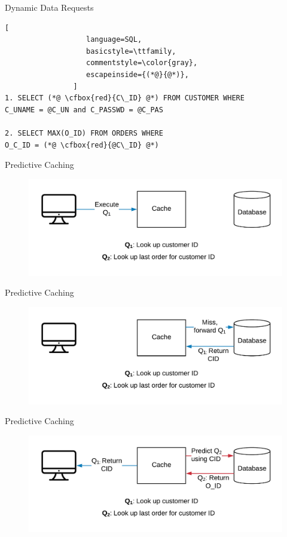 \documentclass[10pt]{beamer}
\newcommand{\cfbox}[2]{%
    \colorlet{currentcolor}{.}%
    {\color{#1}%
    \fbox{\color{currentcolor}#2}}%
}
\begin{document}
\begin{frame}[fragile]{Dynamic Data Requests}
        \begin{lstlisting}[
                   language=SQL,
                   basicstyle=\ttfamily,
                   commentstyle=\color{gray},
                   escapeinside={(*@}{@*)},
                ]
1. SELECT (*@ \cfbox{red}{C\_ID} @*) FROM CUSTOMER WHERE 
C_UNAME = @C_UN and C_PASSWD = @C_PAS

2. SELECT MAX(O_ID) FROM ORDERS WHERE
O_C_ID = (*@ \cfbox{red}{@C\_ID} @*)
        \end{lstlisting}
\end{frame}

\begin{frame}{Predictive Caching}
    \begin{figure}
        \center
        \includegraphics[scale=0.17]{apollo_predictive_execution}
    \end{figure}
\end{frame}

\begin{frame}{Predictive Caching}
    \begin{figure}
        \center
        \includegraphics[scale=0.17]{apollo_predictive_execution_2}
    \end{figure}
\end{frame}

\begin{frame}{Predictive Caching}
    \begin{figure}
        \center
        \includegraphics[scale=0.17]{apollo_predictive_execution_4}
    \end{figure}
\end{frame}
\end{document}
